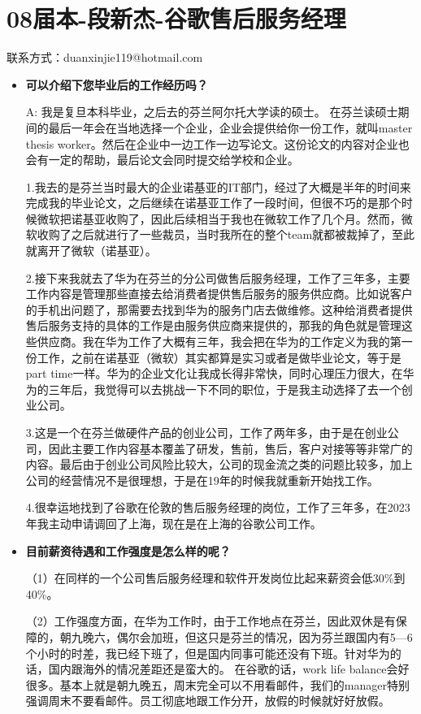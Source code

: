 \section{08届本-段新杰-谷歌售后服务经理}
联系方式：duanxinjie119@hotmail.com
\begin{itemize}
\setlength{\parindent}{2em} 
    \item \textbf{可以介绍下您毕业后的工作经历吗？}
   
    A: 我是复旦本科毕业，之后去的芬兰阿尔托大学读的硕士。
在芬兰读硕士期间的最后一年会在当地选择一个企业，企业会提供给你一份工作，就叫master thesis worker。然后在企业中一边工作一边写论文。这份论文的内容对企业也会有一定的帮助，最后论文会同时提交给学校和企业。

1.我去的是芬兰当时最大的企业诺基亚的IT部门，经过了大概是半年的时间来完成我的毕业论文，之后继续在诺基亚工作了一段时间，但很不巧的是那个时候微软把诺基亚收购了，因此后续相当于我也在微软工作了几个月。然而，微软收购了之后就进行了一些裁员，当时我所在的整个team就都被裁掉了，至此就离开了微软（诺基亚）。

2.接下来我就去了华为在芬兰的分公司做售后服务经理，工作了三年多，主要工作内容是管理那些直接去给消费者提供售后服务的服务供应商。比如说客户的手机出问题了，那需要去找到华为的服务门店去做维修。这种给消费者提供售后服务支持的具体的工作是由服务供应商来提供的，那我的角色就是管理这些供应商。我在华为工作了大概有三年，我会把在华为的工作定义为我的第一份工作，之前在诺基亚（微软）其实都算是实习或者是做毕业论文，等于是part time一样。华为的企业文化让我成长得非常快，同时心理压力很大，在华为的三年后，我觉得可以去挑战一下不同的职位，于是我主动选择了去一个创业公司。

3.这是一个在芬兰做硬件产品的创业公司，工作了两年多，由于是在创业公司，因此主要工作内容基本覆盖了研发，售前，售后，客户对接等等非常广的内容。最后由于创业公司风险比较大，公司的现金流之类的问题比较多，加上公司的经营情况不是很理想，于是在19年的时候我就重新开始找工作。

4.很幸运地找到了谷歌在伦敦的售后服务经理的岗位，工作了三年多，在2023年我主动申请调回了上海，现在是在上海的谷歌公司工作。

    \item \textbf{目前薪资待遇和工作强度是怎么样的呢？}
    
（1）在同样的一个公司售后服务经理和软件开发岗位比起来薪资会低30\%到40\%。
    
（2）工作强度方面，在华为工作时，由于工作地点在芬兰，因此双休是有保障的，朝九晚六，偶尔会加班，但这只是芬兰的情况，因为芬兰跟国内有5—6个小时的时差，我已经下班了，但是国内同事可能还没有下班。针对华为的话，国内跟海外的情况差距还是蛮大的。
在谷歌的话，work life balance会好很多。基本上就是朝九晚五，周末完全可以不用看邮件，我们的manager特别强调周末不要看邮件。员工彻底地跟工作分开，放假的时候就好好放假。


\end{itemize}
